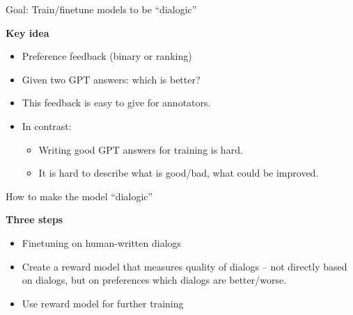 \begin{vbframe}{Goal: Train/finetune models to be ``dialogic''}

\vfill

\textbf{Key idea}

	\begin{itemize}
		\item Preference feedback (binary or
                  ranking)
                  \item Given two GPT answers: which is
                    better?
                    \item This feedback is easy to give for
                      annotators.
                      \item In contrast:
	\begin{itemize}
                    \item Writing good GPT answers for
                      training is hard.
                    \item It is hard to describe what is good/bad,
                      what could be improved.
	\end{itemize}
	\end{itemize}

\vfill

\end{vbframe}


\begin{vbframe}{How to make the model ``dialogic''}

\vfill

\textbf{Three steps}

	\begin{itemize}
		\item Finetuning on human-written dialogs
                \item Create a reward model that measures
		quality of dialogs -- not directly based on dialogs,
		but on preferences which dialogs are
		better/worse.
                \item Use reward model for further training
	\end{itemize}

\vfill

\end{vbframe}


